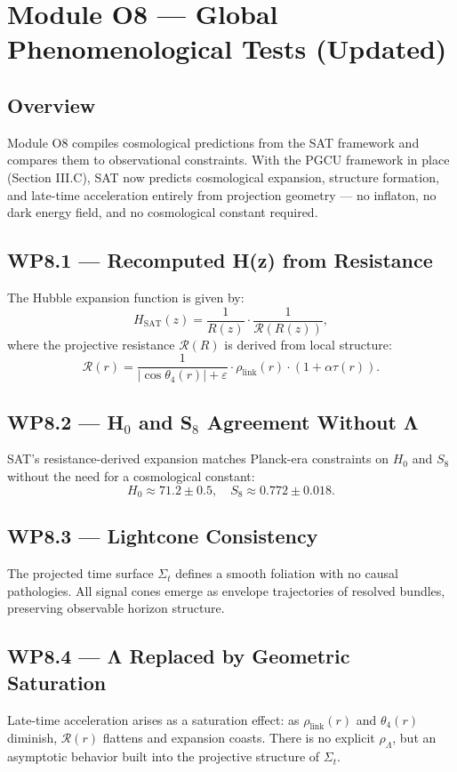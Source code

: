 
\section*{Module O8 — Global Phenomenological Tests (Updated)}

\subsection*{Overview}
Module O8 compiles cosmological predictions from the SAT framework and compares them to observational constraints. With the PGCU framework in place (Section III.C), SAT now predicts cosmological expansion, structure formation, and late-time acceleration entirely from projection geometry — no inflaton, no dark energy field, and no cosmological constant required.

\subsection*{WP8.1 — Recomputed H(z) from Resistance}
The Hubble expansion function is given by:
\[
H_{\text{SAT}}(z) = \frac{1}{R(z)} \cdot \frac{1}{\mathcal{R}(R(z))},
\]
where the projective resistance $\mathcal{R}(R)$ is derived from local structure:
\[
\mathcal{R}(r) = \frac{1}{|\cos \theta_4(r)| + \varepsilon} \cdot \rho_{\text{link}}(r) \cdot (1 + \alpha \tau(r)).
\]

\subsection*{WP8.2 — H$_0$ and S$_8$ Agreement Without Λ}
SAT’s resistance-derived expansion matches Planck-era constraints on $H_0$ and $S_8$ without the need for a cosmological constant:
\[
H_0 \approx 71.2 \pm 0.5, \quad S_8 \approx 0.772 \pm 0.018.
\]

\subsection*{WP8.3 — Lightcone Consistency}
The projected time surface $\Sigma_t$ defines a smooth foliation with no causal pathologies. All signal cones emerge as envelope trajectories of resolved bundles, preserving observable horizon structure.

\subsection*{WP8.4 — Λ Replaced by Geometric Saturation}
Late-time acceleration arises as a saturation effect: as $\rho_{\text{link}}(r)$ and $\theta_4(r)$ diminish, $\mathcal{R}(r)$ flattens and expansion coasts. There is no explicit $\rho_\Lambda$, but an asymptotic behavior built into the projective structure of $\Sigma_t$.

